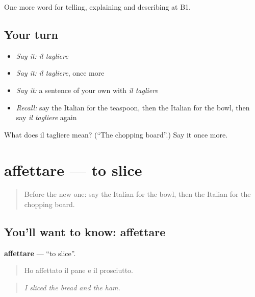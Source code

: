 \begin{grammarlens}[title={What you've built}]
One more word for telling, explaining and describing at B1.
\end{grammarlens}

\subsection*{Your turn}
\begin{itemize}
\raggedright
  \item \emph{Say it:} \emph{il tagliere}
  \item \emph{Say it:} \emph{il tagliere}, once more
  \item \emph{Say it:} a sentence of your own with \emph{il tagliere}
  \item \emph{Recall:} say the Italian for the teaspoon, then the Italian for the bowl, then say \emph{il tagliere} again
\end{itemize}

\begin{tcolorbox}[breakable,colback=teal!4,colframe=teal!35!black,title={Before you move on}]
What does il tagliere mean? (\textquotedblleft{}The chopping board\textquotedblright{}.) Say it once more.
\end{tcolorbox}
\section[affettare]{affettare — to slice}

\label{lesson:IT-C332-affettare}



\begin{quote}
Before the new one: say the Italian for the bowl, then the Italian for the chopping board.
\end{quote}

\subsection*{You'll want to know: affettare}
\textbf{affettare} — \textquotedblleft{}to slice\textquotedblright{}.

\begin{quote}
Ho affettato il pane e il prosciutto.
\end{quote}

\begin{quote}
\emph{I sliced the bread and the ham.}
\end{quote}

